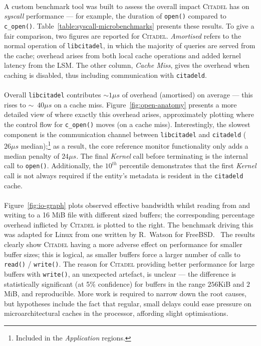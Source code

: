 \paragraph{} A custom benchmark tool was built to assess the overall impact \textsc{Citadel} has on \textit{syscall} performance --- for example, the duration of \texttt{open()} compared to \texttt{c\_open()}. Table~\ref{table:syscall-microbenchmarks} presents these results. To give a fair comparison, two figures are reported for \textsc{Citadel}. \textit{Amortised} refers to the normal operation of \texttt{libcitadel}, in which the majority of queries are served from the cache; overhead arises from both local cache operations and added kernel latency from the LSM. The other column, \textit{Cache Miss}, gives the overhead when caching is disabled, thus including communication with \texttt{citadeld}.

\paragraph{} Overall \texttt{libcitadel} contributes $\sim{}1 \mu s$ of overhead (amortised) on average --- this rises to $\sim$~$40 \mu s$ on a cache miss. Figure~\ref{fig:open-anatomy} presents a more detailed view of where exactly this overhead arises, approximately plotting where the control flow for \texttt{c\_open()} moves (on a cache miss). Interestingly, the slowest component is the communication channel between \texttt{libcitadel} and \texttt{citadeld} ($26\mu s$ median);\footnote{Included in the \textit{Application} regions.} as a result, the core reference monitor functionality only adds a median penalty of $24\mu s$. The final \textit{Kernel} call before terminating is the internal call to \texttt{open()}. Additionally, the $10^{th}$ percentile demonstrates that the first \textit{Kernel} call is not always required if the entity's metadata is resident in the \texttt{citadeld} cache.

\paragraph{} Figure~\ref{fig:io-graph} plots observed effective bandwidth whilst reading from and writing to a 16 MiB file with different sized buffers; the corresponding percentage overhead inflicted by \textsc{Citadel} is plotted to the right. The benchmark driving this was adapted for Linux from one written by R.~Watson for FreeBSD.~\cite{l41-benchmark} The results clearly show \textsc{Citadel} having a more adverse effect on performance for smaller buffer sizes; this is logical, as smaller buffers force a larger number of calls to \texttt{read()} / \texttt{write()}. The reason for \textsc{Citadel} providing better performance for large buffers with \texttt{write()}, an unexpected artefact, is unclear --- the difference is statistically significant (at 5\% confidence) for buffers in the range $256$KiB and $2$ MiB, and reproducible. More work is required to narrow down the root causes, but hypotheses include the fact that regular, small delays could ease pressure on microarchitectural caches in the processor, affording slight optimisations.




